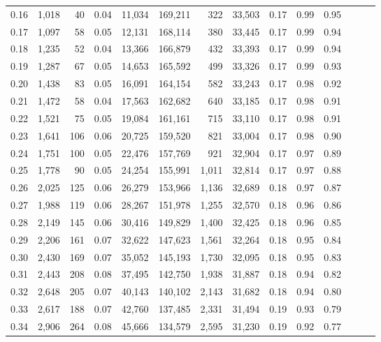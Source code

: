 \begin{tabular}{rrrrrrrrrrrrrr}
0.16 &  1,018 &   40 &  0.04 &   11,034 &  169,211 &     322 &  33,503 &  0.17 &  0.99 &      0.95 \\
0.17 &  1,097 &   58 &  0.05 &   12,131 &  168,114 &     380 &  33,445 &  0.17 &  0.99 &      0.94 \\
0.18 &  1,235 &   52 &  0.04 &   13,366 &  166,879 &     432 &  33,393 &  0.17 &  0.99 &      0.94 \\
0.19 &  1,287 &   67 &  0.05 &   14,653 &  165,592 &     499 &  33,326 &  0.17 &  0.99 &      0.93 \\
0.20 &  1,438 &   83 &  0.05 &   16,091 &  164,154 &     582 &  33,243 &  0.17 &  0.98 &      0.92 \\
0.21 &  1,472 &   58 &  0.04 &   17,563 &  162,682 &     640 &  33,185 &  0.17 &  0.98 &      0.91 \\
0.22 &  1,521 &   75 &  0.05 &   19,084 &  161,161 &     715 &  33,110 &  0.17 &  0.98 &      0.91 \\
0.23 &  1,641 &  106 &  0.06 &   20,725 &  159,520 &     821 &  33,004 &  0.17 &  0.98 &      0.90 \\
0.24 &  1,751 &  100 &  0.05 &   22,476 &  157,769 &     921 &  32,904 &  0.17 &  0.97 &      0.89 \\
0.25 &  1,778 &   90 &  0.05 &   24,254 &  155,991 &   1,011 &  32,814 &  0.17 &  0.97 &      0.88 \\
0.26 &  2,025 &  125 &  0.06 &   26,279 &  153,966 &   1,136 &  32,689 &  0.18 &  0.97 &      0.87 \\
0.27 &  1,988 &  119 &  0.06 &   28,267 &  151,978 &   1,255 &  32,570 &  0.18 &  0.96 &      0.86 \\
0.28 &  2,149 &  145 &  0.06 &   30,416 &  149,829 &   1,400 &  32,425 &  0.18 &  0.96 &      0.85 \\
0.29 &  2,206 &  161 &  0.07 &   32,622 &  147,623 &   1,561 &  32,264 &  0.18 &  0.95 &      0.84 \\
0.30 &  2,430 &  169 &  0.07 &   35,052 &  145,193 &   1,730 &  32,095 &  0.18 &  0.95 &      0.83 \\
0.31 &  2,443 &  208 &  0.08 &   37,495 &  142,750 &   1,938 &  31,887 &  0.18 &  0.94 &      0.82 \\
0.32 &  2,648 &  205 &  0.07 &   40,143 &  140,102 &   2,143 &  31,682 &  0.18 &  0.94 &      0.80 \\
0.33 &  2,617 &  188 &  0.07 &   42,760 &  137,485 &   2,331 &  31,494 &  0.19 &  0.93 &      0.79 \\
0.34 &  2,906 &  264 &  0.08 &   45,666 &  134,579 &   2,595 &  31,230 &  0.19 &  0.92 &      0.77 \\

\end{tabular}
